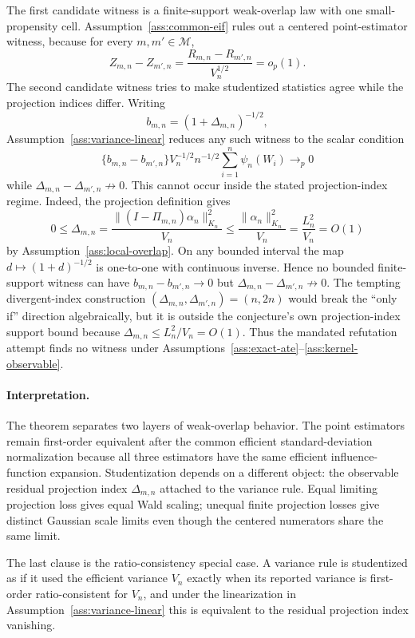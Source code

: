 The first candidate witness is a finite-support weak-overlap law with one
small-propensity cell.  Assumption~\ref{ass:common-eif} rules out a centered
point-estimator witness, because for every \(m,m'\in\mathcal M\),
\[
  Z_{m,n}-Z_{m',n}
  =
  \frac{R_{m,n}-R_{m',n}}{V_n^{1/2}}
  =o_p(1).
\]
The second candidate witness tries to make studentized statistics agree while
the projection indices differ.  Writing
\[
  b_{m,n}=(1+\Delta_{m,n})^{-1/2},
\]
Assumption~\ref{ass:variance-linear} reduces any such witness to the scalar
condition
\[
  \{b_{m,n}-b_{m',n}\}
  V_n^{-1/2}n^{-1/2}\sum_{i=1}^n\psi_n(W_i)\to_p0
\]
while \(\Delta_{m,n}-\Delta_{m',n}\not\to0\).  This cannot occur inside the
stated projection-index regime.  Indeed, the projection definition gives
\[
  0\le \Delta_{m,n}
  =
  \frac{\|(I-\Pi_{m,n})\alpha_n\|_{K_n}^2}{V_n}
  \le
  \frac{\|\alpha_n\|_{K_n}^2}{V_n}
  =
  \frac{L_n^2}{V_n}
  =O(1)
\]
by Assumption~\ref{ass:local-overlap}.  On any bounded interval the map
\(d\mapsto(1+d)^{-1/2}\) is one-to-one with continuous inverse.  Hence no
bounded finite-support witness can have \(b_{m,n}-b_{m',n}\to0\) but
\(\Delta_{m,n}-\Delta_{m',n}\not\to0\).  The tempting divergent-index
construction \((\Delta_{m,n},\Delta_{m',n})=(n,2n)\) would break the
``only if'' direction algebraically, but it is outside the conjecture's own
projection-index support bound because \(\Delta_{m,n}\le L_n^2/V_n=O(1)\).
Thus the mandated refutation attempt finds no witness under
Assumptions~\ref{ass:exact-ate}--\ref{ass:kernel-observable}.

\paragraph{Interpretation.}
The theorem separates two layers of weak-overlap behavior.  The point
estimators remain first-order equivalent after the common efficient
standard-deviation normalization because all three estimators have the same
efficient influence-function expansion.  Studentization depends on a different
object: the observable residual projection index \(\Delta_{m,n}\) attached to
the variance rule.  Equal limiting projection loss gives equal Wald scaling;
unequal finite projection losses give distinct Gaussian scale limits even
though the centered numerators share the same limit.

The last clause is the ratio-consistency special case.  A variance rule is
studentized as if it used the efficient variance \(V_n\) exactly when its
reported variance is first-order ratio-consistent for \(V_n\), and under the
linearization in Assumption~\ref{ass:variance-linear} this is equivalent to
the residual projection index vanishing.

